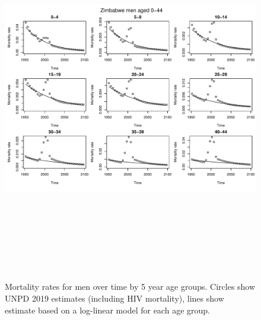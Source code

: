 \documentclass{article}
\begin{document}
\begin{figure}
\includegraphics[width=16cm,height=16cm]{EstimatingRatesFromUNPDv2-MortalityMen1} 

\caption{Mortality rates for men over time by 5 year age groups. Circles show UNPD 2019 estimates (including HIV mortality), lines show estimate based on a log-linear model for each age group.}
\label{Mortalitymen1}
\end{figure}
\end{document}
